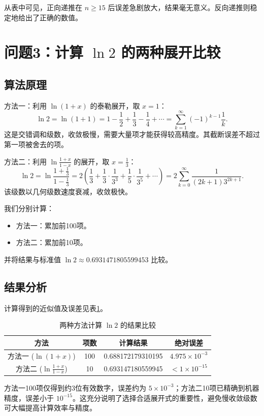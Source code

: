 \documentclass{article}
\begin{document}
从表中可见，正向递推在 \(n\ge 15\) 后误差急剧放大，结果毫无意义。反向递推则稳定地给出了正确的数值。

\section{问题3：计算 \(\ln 2\) 的两种展开比较}

\subsection{算法原理}
方法一：利用 \(\ln(1+x)\) 的泰勒展开，取 \(x=1\)：
\[
\ln 2 = \ln(1+1) = 1 - \frac{1}{2} + \frac{1}{3} - \frac{1}{4} + \cdots = \sum_{k=1}^{\infty} (-1)^{k-1} \frac{1}{k}.
\]
这是交错调和级数，收敛极慢，需要大量项才能获得较高精度。其截断误差不超过第一项被舍去的项。

方法二：利用 \(\ln\frac{1+x}{1-x}\) 的展开，取 \(x=\frac{1}{3}\)：
\[
\ln 2 = \ln\frac{1+\frac{1}{3}}{1-\frac{1}{3}} = 2\left( \frac{1}{3} + \frac{1}{3}\cdot\frac{1}{3^3} + \frac{1}{5}\cdot\frac{1}{3^5} + \cdots \right) = 2\sum_{k=0}^{\infty} \frac{1}{(2k+1)3^{2k+1}}.
\]
该级数以几何级数速度衰减，收敛极快。

我们分别计算：
\begin{itemize}
    \item 方法一：累加前100项。
    \item 方法二：累加前10项。
\end{itemize}
并将结果与标准值 \(\ln 2 \approx 0.6931471805599453\) 比较。

\subsection{结果分析}
计算得到的近似值及误差见表\ref{tab:q3}。

\begin{table}[htbp]
\centering
\caption{两种方法计算 \(\ln 2\) 的结果比较}
\label{tab:q3}
\begin{tabular}{|c|c|c|c|}
\hline
方法 & 项数 & 计算结果 & 绝对误差 \\
\hline
方法一 (\(\ln(1+x)\)) & 100 & 0.688172179310195 & \(4.975\times 10^{-3}\) \\
方法二 (\(\ln\frac{1+x}{1-x}\)) & 10 & 0.693147180559945 & \(< 1\times 10^{-15}\) \\
\hline
\end{tabular}
\end{table}

方法一100项仅得到约3位有效数字，误差约为 \(5\times 10^{-3}\)；方法二10项已精确到机器精度，误差小于 \(10^{-15}\)。这充分说明了选择合适展开式的重要性，避免慢收敛级数可大幅提高计算效率与精度。
\end{document}

